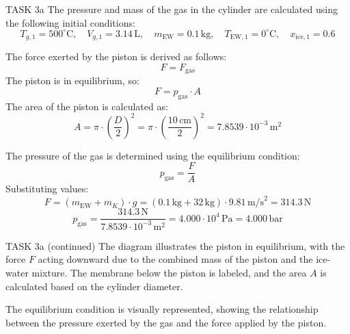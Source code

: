 TASK 3a  
The pressure and mass of the gas in the cylinder are calculated using the following initial conditions:  
\[
T_{g,1} = 500^\circ\text{C}, \quad V_{g,1} = 3.14 \, \text{L}, \quad m_{\text{EW}} = 0.1 \, \text{kg}, \quad T_{\text{EW},1} = 0^\circ\text{C}, \quad x_{\text{ice},1} = 0.6
\]  

The force exerted by the piston is derived as follows:  
\[
F = F_{\text{gas}}
\]  
The piston is in equilibrium, so:  
\[
F = p_{\text{gas}} \cdot A
\]  
The area of the piston is calculated as:  
\[
A = \pi \cdot \left( \frac{D}{2} \right)^2 = \pi \cdot \left( \frac{10 \, \text{cm}}{2} \right)^2 = 7.8539 \cdot 10^{-3} \, \text{m}^2
\]  

The pressure of the gas is determined using the equilibrium condition:  
\[
p_{\text{gas}} = \frac{F}{A}
\]  
Substituting values:  
\[
F = (m_{\text{EW}} + m_K) \cdot g = (0.1 \, \text{kg} + 32 \, \text{kg}) \cdot 9.81 \, \text{m/s}^2 = 314.3 \, \text{N}
\]  
\[
p_{\text{gas}} = \frac{314.3 \, \text{N}}{7.8539 \cdot 10^{-3} \, \text{m}^2} = 4.000 \cdot 10^4 \, \text{Pa} = 4.000 \, \text{bar}
\]  

TASK 3a (continued)  
The diagram illustrates the piston in equilibrium, with the force \( F \) acting downward due to the combined mass of the piston and the ice-water mixture. The membrane below the piston is labeled, and the area \( A \) is calculated based on the cylinder diameter.  

The equilibrium condition is visually represented, showing the relationship between the pressure exerted by the gas and the force applied by the piston.